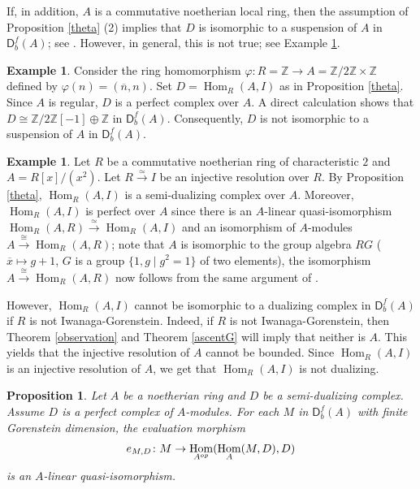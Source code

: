 \documentclass{amsart}
\newcommand{\D}{\mathsf{D}}
\newcommand{\0}{{\bf{0}}}
\DeclareMathOperator{\Hom}{Hom}
\newtheorem{proposition}[theorem]{Proposition}
\theoremstyle{definition}
\newtheorem{example}[theorem]{Example}
\begin{document}
 If, in addition, $A$ is a commutative noetherian local ring, then the assumption of Proposition \ref{theta} (2) implies that $D$ is isomorphic to a suspension of $A$ in $\D^f_b(A)$; see \cite[Proposition 8.3]{Chr01}. However, in general, this is not true; see Example \ref{non-suspension}.
\begin{example}\label{non-suspension}
   Consider the ring homomorphism $\varphi\colon R=\mathbb Z\rightarrow A=  \mathbb Z/2\mathbb Z\times \mathbb Z $ defined by $\varphi(n)=(\overline{n},n)$. Set $D=\Hom_R(A,I)$ as in Proposition \ref{theta}. Since $A$ is regular, $D$ is a perfect complex over $A$. A direct calculation shows that $D\cong \mathbb Z/2\mathbb Z[-1]\oplus \mathbb Z$ in $\D^f_b(A)$. Consequently, $D$ is not isomorphic to a suspension of $A$ in $\D^f_b(A)$.
   \end{example}
\begin{example}\label{eg.dual}
Let $R$ be a commutative noetherian ring of characteristic $2$ and $A=R[x]/(x^2)$. Let $R\xrightarrow \simeq I$ be an injective resolution over $R$. By Proposition \ref{theta}, $\Hom_R(A,I)$ is a semi-dualizing complex over $A$. Moreover, $\Hom_R(A,I)$ is perfect over $A$ since there is an $A$-linear quasi-isomorphism $\Hom_R(A,R)\xrightarrow \simeq \Hom_R(A,I)$ and an isomorphism of $A$-modules
$A\xrightarrow \cong \Hom_R(A,R)$; note that $A$ is isomorphic to the group algebra $RG$ ( $\overline{x}\mapsto g+1$, $G$ is a group $\{1, g\mid g^2=1\}$ of two elements), the isomorphism $A\xrightarrow \cong \Hom_R(A,R)$ now follows from the same argument of \cite[Proposition 4.2.6]{Weibel}.

However, $\Hom_R(A,I)$ cannot be isomorphic to a dualizing complex in $\D^f_b(A)$ if $R$ is not Iwanaga-Gorenstein. Indeed, if $R$ is not Iwanaga-Gorenstein, then Theorem \ref{observation} and Theorem \ref{ascentG} will imply that neither is $A$. This yields that the injective resolution of $A$ cannot be bounded. Since $\Hom_R(A,I)$ is an injective resolution of $A$, we get that $\Hom_R(A,I)$ is not dualizing.
\end{example}


\begin{proposition}\label{quasi-iso}
Let $A$ be a noetherian ring and $D$ be a semi-dualizing complex. Assume $D$ is a perfect complex of  $A$-modules.
For each $M$ in $\D^f_b(A)$ with finite Gorenstein dimension, the evaluation morphism
$$
{\rm e}_{M,D} \colon M\rightarrow \Hom_{A^{{}\rm op}}(\Hom_A(M,D),D)
$$
is an $A$-linear quasi-isomorphism.
\end{proposition}
\end{document}
